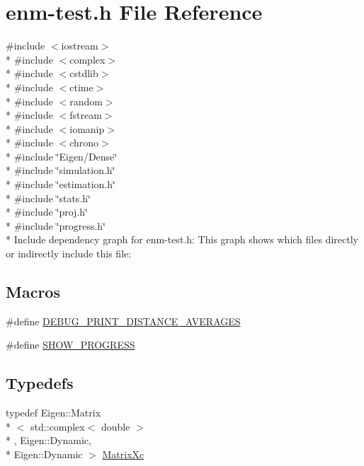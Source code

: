 \hypertarget{enm-test_8h}{\section{enm-\/test.h File Reference}
\label{enm-test_8h}
}
{\ttfamily \#include $<$iostream$>$}\\*
{\ttfamily \#include $<$complex$>$}\\*
{\ttfamily \#include $<$cstdlib$>$}\\*
{\ttfamily \#include $<$ctime$>$}\\*
{\ttfamily \#include $<$random$>$}\\*
{\ttfamily \#include $<$fstream$>$}\\*
{\ttfamily \#include $<$iomanip$>$}\\*
{\ttfamily \#include $<$chrono$>$}\\*
{\ttfamily \#include \char`\"{}Eigen/\+Dense\char`\"{}}\\*
{\ttfamily \#include \char`\"{}simulation.\+h\char`\"{}}\\*
{\ttfamily \#include \char`\"{}estimation.\+h\char`\"{}}\\*
{\ttfamily \#include \char`\"{}stats.\+h\char`\"{}}\\*
{\ttfamily \#include \char`\"{}proj.\+h\char`\"{}}\\*
{\ttfamily \#include \char`\"{}progress.\+h\char`\"{}}\\*
Include dependency graph for enm-\/test.h\+:
This graph shows which files directly or indirectly include this file\+:
\subsection*{Macros}
\begin{DoxyCompactItemize}
\item 
\#define \hyperlink{enm-test_8h_a41ac27655c7d8b6b7490b3206b897a38}{D\+E\+B\+U\+G\+\_\+\+P\+R\+I\+N\+T\+\_\+\+D\+I\+S\+T\+A\+N\+C\+E\+\_\+\+A\+V\+E\+R\+A\+G\+E\+S}
\item 
\#define \hyperlink{enm-test_8h_afe48e666b01ea718cdefb3fc6eeaa13f}{S\+H\+O\+W\+\_\+\+P\+R\+O\+G\+R\+E\+S\+S}
\end{DoxyCompactItemize}
\subsection*{Typedefs}
\begin{DoxyCompactItemize}
\item 
typedef Eigen\+::\+Matrix\\*
$<$ std\+::complex$<$ double $>$\\*
, Eigen\+::\+Dynamic, \\*
Eigen\+::\+Dynamic $>$ \hyperlink{enm-test_8h_ae4c6729274148361e940502083363cec}{Matrix\+Xc}
\end{DoxyCompactItemize}


